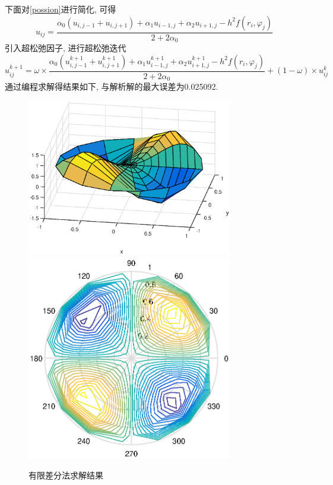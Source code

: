 \documentclass{ctexart}
\begin{document}
下面对\eqref{possion}进行简化, 可得
\begin{equation}
  u_{ij} = \frac{\alpha_0(u_{i,j-1} + u_{i,j+1}) + \alpha_1u_{i-1,j} + \alpha_2u_{i+1,j} - h^2f(r_i, \varphi_j)}{2+2\alpha_0}
\end{equation}
引入超松弛因子, 进行超松弛迭代
\begin{equation}
  u_{ij}^{k+1} = \omega \times \frac{\alpha_0(u_{i,j-1}^{k+1} + u_{i,j+1}^{k+1}) + \alpha_1u_{i-1,j}^{k+1} + \alpha_2u_{i+1,j}^{k+1} - h^2f(r_i, \varphi_j)}{2+2\alpha_0} + (1-\omega)\times u_{ij}^k
\end{equation}
通过编程求解得结果如下, 与解析解的最大误差为0.025092.

\begin{figure}[H]
  \centering
  \includegraphics[width=9cm]{code/p3fig1.eps}%
  \quad
  \includegraphics[width=9cm]{code/p3fig2.eps}
  \caption{有限差分法求解结果}
\end{figure}
\end{document}
